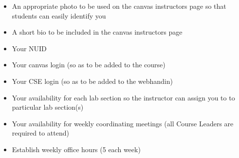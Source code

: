 \documentclass[12pt]{scrartcl}
\begin{document}
\begin{itemize}
  \item An appropriate photo to be used on the canvas instructors 
    page so that students can easily identify you
  \item A short bio to be included in the canvas instructors page 
  \item Your NUID
  \item Your canvas login (so as to be added to the course)
  \item Your CSE login (so as to be added to the webhandin)
  \item Your availability for each lab section so the instructor can 
    assign you to to particular lab section(s) 
  \item Your availability for weekly coordinating meetings (all Course 
    Leaders are required to attend)
  \item Establish weekly office hours (5 each week)
\end{itemize}
\end{document}
